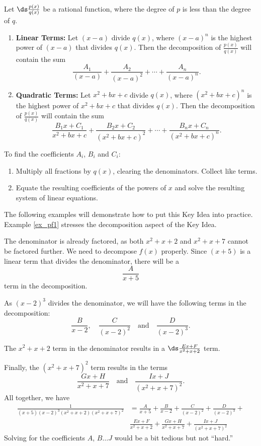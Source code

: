 {Let $\ds \frac{p(x)}{q(x)}$ be a rational function, where the degree of $p$ is less than the degree of $q$.
\begin{enumerate}
	\item	\textbf{Linear Terms:} Let $(x-a)$ divide $q(x)$, where $(x-a)^n$ is the highest power of $(x-a)$ that divides $q(x)$. Then the decomposition of $\frac{p(x)}{q(x)}$ will contain the sum
	\[
	\frac{A_1}{(x-a)} + \frac{A_2}{(x-a)^2} + \cdots +\frac{A_n}{(x-a)^n}.
	\]
	\item		\textbf{Quadratic Terms:} Let $x^2+bx+c$ divide $q(x)$, where $(x^2+bx+c)^n$ is the highest power of $x^2+bx+c$ that divides $q(x)$. Then the decomposition of $\frac{p(x)}{q(x)}$ will contain the sum 
	\[
	\frac{B_1x+C_1}{x^2+bx+c}+\frac{B_2x+C_2}{(x^2+bx+c)^2}+\cdots+\frac{B_nx+C_n}{(x^2+bx+c)^n}.
	\]
	\end{enumerate}
	To find the coefficients $A_i$, $B_i$ and $C_i$:
	\begin{enumerate}
	\item	Multiply all fractions by $q(x)$, clearing the denominators. Collect like terms.
	\item		Equate the resulting coefficients of the powers of $x$ and solve the resulting system of linear equations.
	\end{enumerate}
}

The following examples will demonstrate how to put this Key Idea into practice. Example \ref{ex_pf1} stresses the decomposition aspect of the Key Idea.\\

{The denominator is already factored, as both $x^2+x+2$ and $x^2+x+7$ cannot be factored further. We need to decompose $f(x)$ properly. Since $(x+5)$ is a linear term that divides the denominator, there will be a 
\[
\frac{A}{x+5}
\]
term in the decomposition.

As $(x-2)^3$ divides the denominator, we will have the following terms in the decomposition:
\[
\frac{B}{x-2},\quad \frac{C}{(x-2)^2}\quad \text{and}\quad \frac{D}{(x-2)^3}.
\]

The $x^2+x+2$ term in the denominator results in a $\ds\frac{Ex+F}{x^2+x+2}$ term.

Finally, the $(x^2+x+7)^2$ term results in the terms 
\[
\frac{Gx+H}{x^2+x+7}\quad \text{and}\quad \frac{Ix+J}{(x^2+x+7)^2}.
\]
All together, we have 
\begin{align*}
\frac{1}{(x+5)(x-2)^3(x^2+x+2)(x^2+x+7)^2} &= \frac{A}{x+5} + \frac{B}{x-2}+ \frac{C}{(x-2)^2}+\frac{D}{(x-2)^3}+ \\
		& \frac{Ex+F}{x^2+x+2}+\frac{Gx+H}{x^2+x+7}+\frac{Ix+J}{(x^2+x+7)^2}
\end{align*}
Solving for the coefficients $A$, $B \ldots J$ would be a bit tedious but not ``hard.''
}\\

